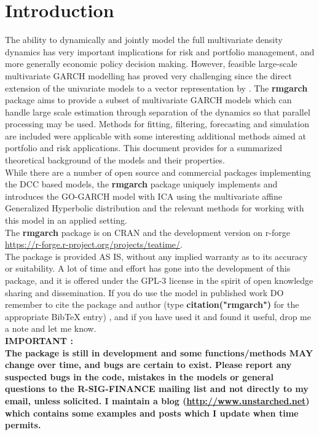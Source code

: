 \section{Introduction}
The ability to dynamically and jointly model the full multivariate density
dynamics has very important implications for risk and portfolio management,
and more generally economic policy decision making. However, feasible large-scale
multivariate GARCH modelling has proved very challenging since the direct extension
of the univariate models to a vector representation by \cite{Bollerslev1988}.
The {\bf rmgarch} package aims to provide a subset of multivariate GARCH models
which can handle large scale estimation through separation of the dynamics
so that parallel processing may be used. Methods for fitting, filtering,
forecasting and simulation are included were applicable with some interesting
additional methods aimed at portfolio and risk applications. This document provides
for a summarized theoretical background of the models and their properties.\\
While there are a number of open source and commercial packages implementing the
DCC based models, the {\bf rmgarch} package uniquely implements and introduces
the GO-GARCH model with ICA using the multivariate affine Generalized Hyperbolic
distribution and the relevant methods for working with this model in an applied setting.\\
The {\bf rmgarch} package is on CRAN and the development version on r-forge
\url{https://r-forge.r-project.org/projects/teatime/}.\\
The package is provided AS IS, without any implied warranty as to its accuracy
or suitability. A lot of time and effort has gone into the development of this
package, and it is offered under the GPL-3 license in the spirit of open knowledge
sharing and dissemination. If you do use the model in published work DO remember
to cite the package and author (type {\bf citation("rmgarch")} for the
appropriate BibTeX entry) , and if you have used it and found it useful, drop me
a note and let me know.\\
\textbf{ IMPORTANT :\\
The package is still in development and some functions/methods MAY change over time, 
and bugs are certain to exist. Please report any suspected bugs in the code, mistakes 
in the models or general questions to the R-SIG-FINANCE mailing list and not directly 
to my email, unless solicited. I maintain a blog (\url{http://www.unstarched.net}) 
which contains some examples and posts which I update when time permits.}
